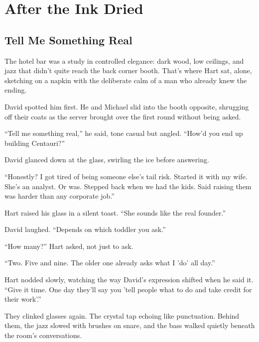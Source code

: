 
\section{After the Ink Dried}

\subsection{Tell Me Something Real}

The hotel bar was a study in controlled elegance: dark wood, low ceilings, and jazz that didn’t 
quite reach the back corner booth.
That’s where Hart sat, alone, sketching on a napkin with the deliberate calm of a man who already knew 
the ending.

David spotted him first.
He and Michael slid into the booth opposite, shrugging off their coats as the server brought over the 
first round without being asked.

``Tell me something real,'' he said, tone casual but angled. ``How’d you end up building Centauri?''

David glanced down at the glass, swirling the ice before answering.

``Honestly? I got tired of being someone else’s tail risk. Started it with my wife. She’s an analyst. 
Or was. Stepped back when we had the kids. Said raising them was harder than any corporate job.''

Hart raised his glass in a silent toast. ``She sounds like the real founder.''

David laughed. ``Depends on which toddler you ask.''

``How many?'' Hart asked, not just to ask.

``Two. Five and nine. The older one already asks what I 'do' all day.''

Hart nodded slowly, watching the way David’s expression shifted when he said it.
``Give it time. One day they’ll say you 'tell people what to do and take credit for their work'.''

They clinked glasses again. The crystal tap echoing like punctuation. Behind them, the jazz slowed with 
brushes on snare, and the bass walked quietly beneath the room’s conversations.

\medskip

